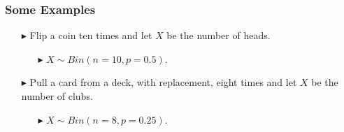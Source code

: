 \documentclass[12pt]{beamer}
\begin{document}
\begin{frame}
	\frametitle{Some Examples}
	
	\begin{itemize}
		\item[\color{blue}$\blacktriangleright$] Flip a coin ten times and let $X$ be the number of heads.
		\begin{itemize}
			\item[\color{blue}$\blacktriangleright$] $X \sim Bin(n = 10, p = 0.5)$.
		\end{itemize}
		
		\item[\color{blue}$\blacktriangleright$] Pull a card from a deck, with replacement, eight times and let $X$ be the number of clubs.
		\begin{itemize}
			\item[\color{blue}$\blacktriangleright$]$X \sim Bin(n = 8, p = 0.25)$.
		\end{itemize}

	\end{itemize}
	
\end{frame}
\end{document}
